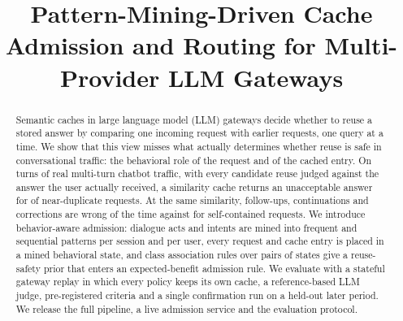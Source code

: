 \documentclass[conference]{IEEEtran}
\begin{document}
\title{Pattern-Mining-Driven Cache Admission and Routing for Multi-Provider LLM Gateways}

\author{
\and
{}
\and
{}
\and
{}
}

\maketitle

\begin{abstract}
Semantic caches in large language model (LLM) gateways decide whether to reuse a stored answer by comparing one incoming request with earlier requests, one query at a time. We show that this view misses what actually determines whether reuse is safe in conversational traffic: the behavioral role of the request and of the cached entry. On \nTurns{} turns of real multi-turn chatbot traffic, with every candidate reuse judged against the answer the user actually received, a similarity cache returns an unacceptable answer for \nearWrongAll{} of near-duplicate requests. At the same similarity, follow-ups, continuations and corrections are wrong \nearWrongDep{} of the time against \nearWrongSelf{} for self-contained requests. We introduce behavior-aware admission: dialogue acts and intents are mined into frequent and sequential patterns per session and per user, every request and cache entry is placed in a mined behavioral state, and class association rules over pairs of states give a reuse-safety prior that enters an expected-benefit admission rule. We evaluate with a stateful gateway replay in which every policy keeps its own cache, a reference-based LLM judge, pre-registered criteria and a single confirmation run on a held-out later period. \resultSentence{} We release the full pipeline, a live admission service and the evaluation protocol.
\end{abstract}
\end{document}

